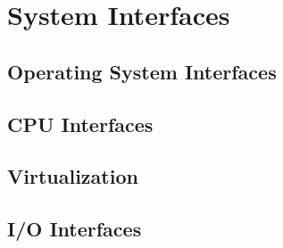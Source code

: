 \chapter{System Interfaces}

\section{Operating System Interfaces}




\section{CPU Interfaces}



\section{Virtualization}


\section{I/O Interfaces}
\unfinished
